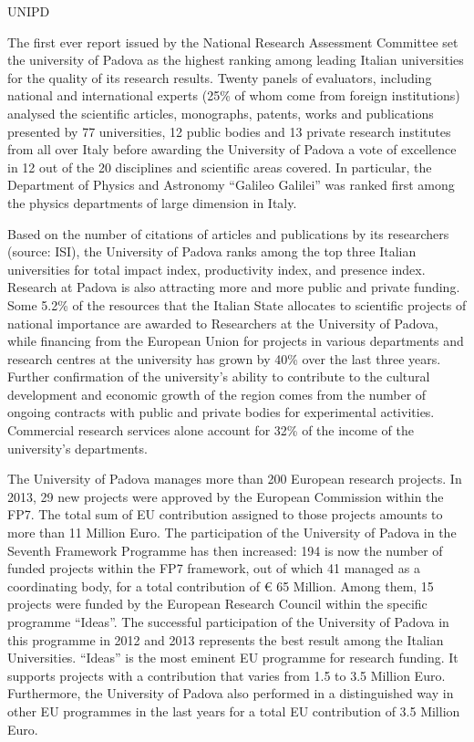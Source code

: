 \begin{sitedescription}{UNIPD} \label{desc:UNIPD}

The first ever report issued by the National Research Assessment Committee set the university of Padova as the highest ranking among leading Italian universities for the quality of its research results.
Twenty panels of evaluators, including national and international experts (25\% of whom come from foreign institutions) analysed the scientific articles, monographs, patents, works and publications presented by 77 universities, 12 public bodies and 13 private research institutes from all over Italy before awarding the University of Padova a vote of excellence in 12 out of the 20 disciplines and scientific areas covered.
In particular, the Department of Physics and Astronomy ``Galileo Galilei'' was ranked first among the physics departments of large dimension in Italy.

Based on the number of citations of articles and publications by its researchers (source: ISI), the University of Padova ranks among the top three Italian universities for total impact index, productivity index, and presence index.
Research at Padova is also attracting more and more public and private funding. Some 5.2\% of the resources that the Italian State allocates to scientific projects of national importance are awarded to Researchers at the University of Padova, while financing from the European Union for projects in various departments and research centres at the university has grown by 40\% over the last three years.
Further confirmation of the university’s ability to contribute to the cultural development and economic growth of the region comes from the number of ongoing contracts with public and private bodies for experimental activities. Commercial research services alone account for 32\% of the income of the university’s departments.

The University of Padova manages more than 200 European research projects. In 2013, 29 new projects were approved by the European Commission within the FP7. The total sum of EU contribution assigned to those projects amounts to more than 11 Million Euro.
The participation of the University of Padova in the Seventh Framework Programme has then increased: 194 is now the number of funded projects within the FP7 framework, out of which 41 managed as a coordinating body, for a total contribution of € 65 Million. Among them, 15 projects were funded by the European Research Council within the specific programme “Ideas”.
The successful participation of the University of Padova in this programme in 2012 and 2013 represents the best result among the Italian Universities. “Ideas” is the most eminent EU programme for research funding. It supports projects with a contribution that varies from 1.5 to 3.5 Million Euro. Furthermore, the University of Padova also performed in a distinguished way in other EU programmes in the last years for a total EU contribution of 3.5 Million Euro.



\end{sitedescription}
